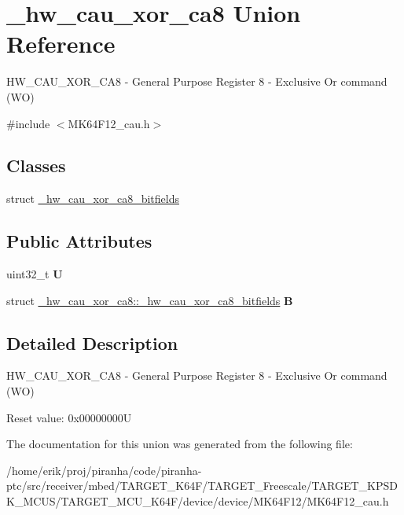 \hypertarget{union__hw__cau__xor__ca8}{}\section{\+\_\+hw\+\_\+cau\+\_\+xor\+\_\+ca8 Union Reference}
\label{union__hw__cau__xor__ca8}


H\+W\+\_\+\+C\+A\+U\+\_\+\+X\+O\+R\+\_\+\+C\+A8 -\/ General Purpose Register 8 -\/ Exclusive Or command (WO)  




{\ttfamily \#include $<$M\+K64\+F12\+\_\+cau.\+h$>$}

\subsection*{Classes}
\begin{DoxyCompactItemize}
\item 
struct \hyperlink{struct__hw__cau__xor__ca8_1_1__hw__cau__xor__ca8__bitfields}{\+\_\+hw\+\_\+cau\+\_\+xor\+\_\+ca8\+\_\+bitfields}
\end{DoxyCompactItemize}
\subsection*{Public Attributes}
\begin{DoxyCompactItemize}
\item 
uint32\+\_\+t {\bfseries U}\hypertarget{union__hw__cau__xor__ca8_ac0c62891c8d276b01edaa23584bd0463}{}\label{union__hw__cau__xor__ca8_ac0c62891c8d276b01edaa23584bd0463}

\item 
struct \hyperlink{struct__hw__cau__xor__ca8_1_1__hw__cau__xor__ca8__bitfields}{\+\_\+hw\+\_\+cau\+\_\+xor\+\_\+ca8\+::\+\_\+hw\+\_\+cau\+\_\+xor\+\_\+ca8\+\_\+bitfields} {\bfseries B}\hypertarget{union__hw__cau__xor__ca8_ab656f5289a2e9ef8a42f0a02eefee620}{}\label{union__hw__cau__xor__ca8_ab656f5289a2e9ef8a42f0a02eefee620}

\end{DoxyCompactItemize}


\subsection{Detailed Description}
H\+W\+\_\+\+C\+A\+U\+\_\+\+X\+O\+R\+\_\+\+C\+A8 -\/ General Purpose Register 8 -\/ Exclusive Or command (WO) 

Reset value\+: 0x00000000U 

The documentation for this union was generated from the following file\+:\begin{DoxyCompactItemize}
\item 
/home/erik/proj/piranha/code/piranha-\/ptc/src/receiver/mbed/\+T\+A\+R\+G\+E\+T\+\_\+\+K64\+F/\+T\+A\+R\+G\+E\+T\+\_\+\+Freescale/\+T\+A\+R\+G\+E\+T\+\_\+\+K\+P\+S\+D\+K\+\_\+\+M\+C\+U\+S/\+T\+A\+R\+G\+E\+T\+\_\+\+M\+C\+U\+\_\+\+K64\+F/device/device/\+M\+K64\+F12/M\+K64\+F12\+\_\+cau.\+h\end{DoxyCompactItemize}
